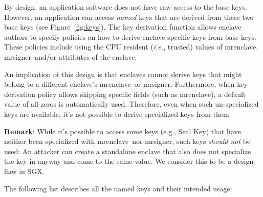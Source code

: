 \documentclass[letterpaper]{article}
\newcommand{\ie}{\textit{i.e.}}
\newcommand{\mrenclave}{\textsf{mrenclave}}
\newcommand{\mrsigner}{\textsf{mrsigner}}
\newcommand{\sk}{\textsf{Seal Key}}
\begin{document}
  By design, an application software does not have raw access to the
  base keys. However, an application can access \textit{named} keys
  that are derived from these two base keys (see
  Figure~\ref{fig:keys}).  The key derivation function allows enclave
  authors to specify policies on how to derive enclave specific keys
  from base keys. These policies include using the CPU resident (\ie,
  trusted) values of \mrenclave, \mrsigner\ and/or attributes of the
  enclave.

  An implication of this design is that enclaves cannot derive keys
  that might belong to a different enclave's \mrenclave\ or
  \mrsigner. Furthermore, when key derivation policy allows skipping
  specific fields (such as \mrenclave), a default value of all-zeros
  is automatically used. Therefore, even when such un-specialized keys
  are available, it's not possible to derive specialized keys from
  them.

  \textbf{Remark}: While it's possible to access some keys (e.g., \sk)
  that have neither been specialized with \mrenclave\ nor \mrsigner,
  such keys \textit{should not} be used: An attacker can create a
  standalone enclave that also does not specialize the key in anyway
  and come to the same value. We consider this to be a design flaw in
  SGX.

  The following list describes all the named keys and their intended
  usage:
\end{document}
